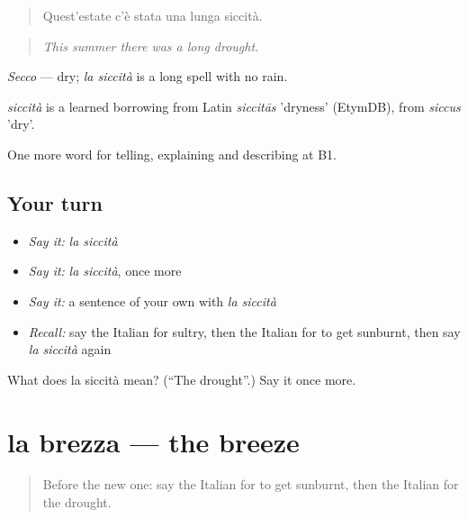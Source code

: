 \begin{quote}
Quest'estate c'è stata una lunga siccità.
\end{quote}

\begin{quote}
\emph{This summer there was a long drought.}
\end{quote}

\emph{Secco} — dry; \emph{la siccità} is a long spell with no rain.

\begin{cousinweb}
\emph{siccità} is a learned borrowing from Latin \emph{siccitās} 'dryness' (EtymDB), from \emph{siccus} 'dry'.
\end{cousinweb}

\begin{grammarlens}[title={What you've built}]
One more word for telling, explaining and describing at B1.
\end{grammarlens}

\subsection*{Your turn}
\begin{itemize}
\raggedright
  \item \emph{Say it:} \emph{la siccità}
  \item \emph{Say it:} \emph{la siccità}, once more
  \item \emph{Say it:} a sentence of your own with \emph{la siccità}
  \item \emph{Recall:} say the Italian for sultry, then the Italian for to get sunburnt, then say \emph{la siccità} again
\end{itemize}

\begin{tcolorbox}[breakable,colback=teal!4,colframe=teal!35!black,title={Before you move on}]
What does la siccità mean? (\textquotedblleft{}The drought\textquotedblright{}.) Say it once more.
\end{tcolorbox}
\section[la brezza]{la brezza — the breeze}

\label{lesson:IT-C466-brezza}



\begin{quote}
Before the new one: say the Italian for to get sunburnt, then the Italian for the drought.
\end{quote}

